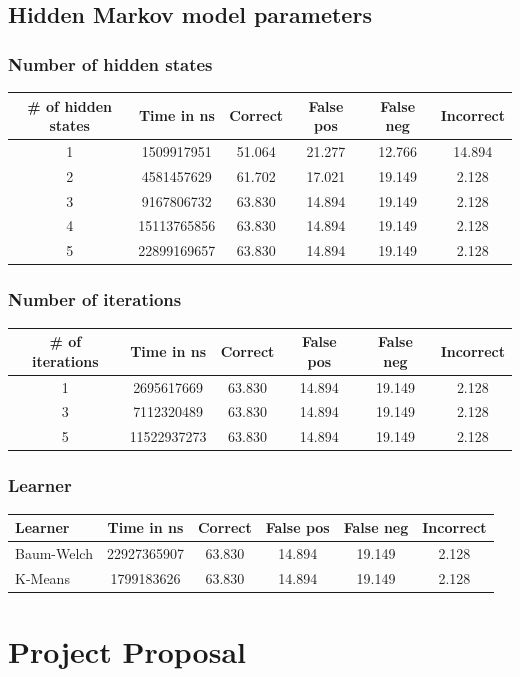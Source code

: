 \documentclass[12pt,a4,notitlepage]{report}
\renewcommand{\_}{\texttt{\symbol{95}}}
\newcommand{\<}{\texttt{\symbol{60}}}
\renewcommand{\>}{\texttt{\symbol{62}}}
\begin{document}
\section{Hidden Markov model parameters}

\subsection{Number of hidden states}

\begin{tabular}{c|ccccc}
\# of hidden states & Time in ns & Correct & False pos & False neg & Incorrect \\ \hline
1 & 1509917951 & 51.064 & 21.277 & 12.766 & 14.894 \\
2 & 4581457629 & 61.702 & 17.021 & 19.149 & 2.128 \\
3 & 9167806732 & 63.830 & 14.894 & 19.149 & 2.128 \\
4 & 15113765856 & 63.830 & 14.894 & 19.149 & 2.128 \\
5 & 22899169657 & 63.830 & 14.894 & 19.149 & 2.128 \\
\end{tabular}

\subsection{Number of iterations}

\begin{tabular}{c|ccccc}
\# of iterations & Time in ns & Correct & False pos & False neg & Incorrect \\ \hline
1 & 2695617669 & 63.830 & 14.894 & 19.149 & 2.128 \\
3 & 7112320489 & 63.830 & 14.894 & 19.149 & 2.128 \\
5 & 11522937273 & 63.830 & 14.894 & 19.149 & 2.128 \\
\end{tabular}

\subsection{Learner}

\begin{tabular}{l|ccccc}
Learner & Time in ns & Correct & False pos & False neg & Incorrect \\ \hline
Baum-Welch & 22927365907 & 63.830 & 14.894 & 19.149 & 2.128\\
K-Means & 1799183626 & 63.830 & 14.894 & 19.149 & 2.128\\
\end{tabular}

\cleardoublepage

\chapter{Project Proposal}



%
\end{document}
